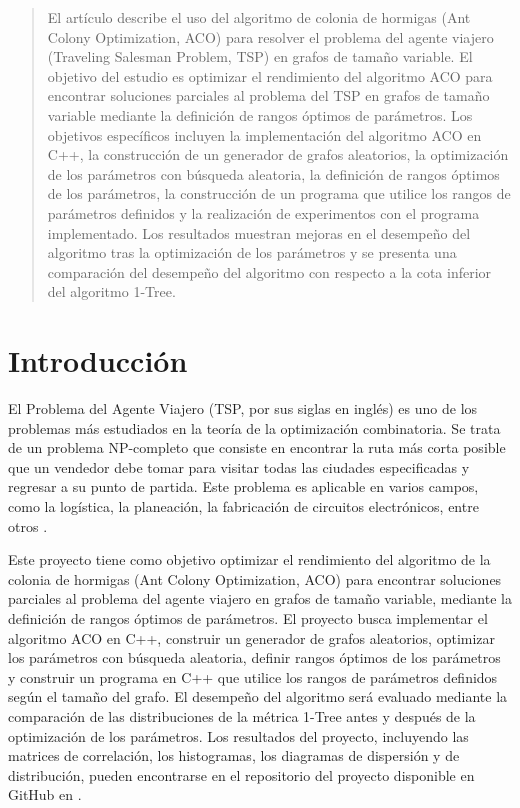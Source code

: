 \documentclass[conference]{IEEEtran}
\begin{document}
\begin{abstract}
El artículo describe el uso del algoritmo de colonia de hormigas (Ant Colony Optimization, ACO) para resolver el problema del agente viajero (Traveling Salesman Problem, TSP) en grafos de tamaño variable. El objetivo del estudio es optimizar el rendimiento del algoritmo ACO para encontrar soluciones parciales al problema del TSP en grafos de tamaño variable mediante la definición de rangos óptimos de parámetros. Los objetivos específicos incluyen la implementación del algoritmo ACO en C++, la construcción de un generador de grafos aleatorios, la optimización de los parámetros con búsqueda aleatoria, la definición de rangos óptimos de los parámetros, la construcción de un programa que utilice los rangos de parámetros definidos y la realización de experimentos con el programa implementado. Los resultados muestran mejoras en el desempeño del algoritmo tras la optimización de los parámetros y se presenta una comparación del desempeño del algoritmo con respecto a la cota inferior del algoritmo 1-Tree.
\end{abstract}


\section{Introducción}
El Problema del Agente Viajero (TSP, por sus siglas en inglés) es uno de los problemas más estudiados en la teoría de la optimización combinatoria. Se trata de un problema NP-completo que consiste en encontrar la ruta más corta posible que un vendedor debe tomar para visitar todas las ciudades especificadas y regresar a su punto de partida. Este problema es aplicable en varios campos, como la logística, la planeación, la fabricación de circuitos electrónicos, entre otros \cite{aco_wiki}.

Este proyecto tiene como objetivo optimizar el rendimiento del algoritmo de la colonia de hormigas (Ant Colony Optimization, ACO) para encontrar soluciones parciales al problema del agente viajero en grafos de tamaño variable, mediante la definición de rangos óptimos de parámetros. El proyecto busca implementar el algoritmo ACO en C++, construir un generador de grafos aleatorios, optimizar los parámetros con búsqueda aleatoria, definir rangos óptimos de los parámetros y construir un programa en C++ que utilice los rangos de parámetros definidos según el tamaño del grafo. El desempeño del algoritmo será evaluado mediante la comparación de las distribuciones de la métrica 1-Tree antes y después de la optimización de los parámetros. Los resultados del proyecto, incluyendo las matrices de correlación, los histogramas, los diagramas de dispersión y de distribución, pueden encontrarse en el repositorio del proyecto disponible en GitHub en \cite{aco_github_2}.
\end{document}

